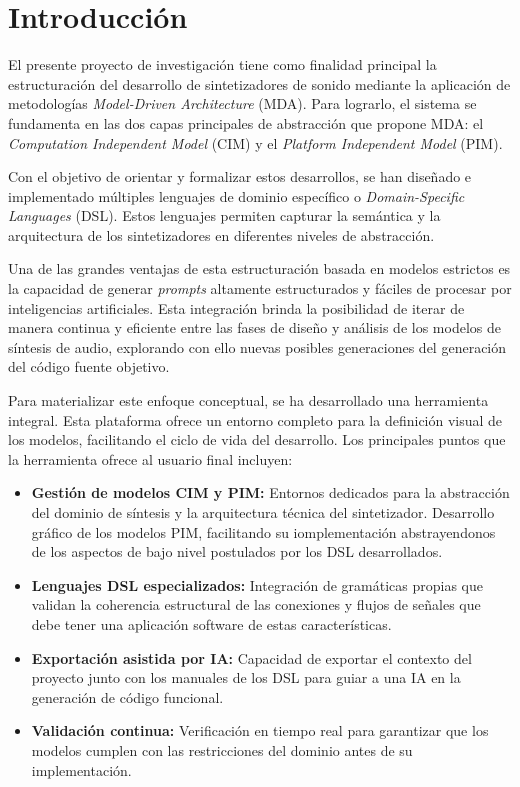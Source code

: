 \chapter{Introducción}

El presente proyecto de investigación tiene como finalidad principal la estructuración del desarrollo de sintetizadores de sonido mediante la aplicación de metodologías \textit{Model-Driven Architecture} (MDA). Para lograrlo, el sistema se fundamenta en las dos capas principales de abstracción que propone MDA: el \textit{Computation Independent Model} (CIM) y el \textit{Platform Independent Model} (PIM).

Con el objetivo de orientar y formalizar estos desarrollos, se han diseñado e implementado múltiples lenguajes de dominio específico o \textit{Domain-Specific Languages} (DSL). Estos lenguajes permiten capturar la semántica y la arquitectura de los sintetizadores en diferentes niveles de abstracción.

Una de las grandes ventajas de esta estructuración basada en modelos estrictos es la capacidad de generar \textit{prompts} altamente estructurados y fáciles de procesar por inteligencias artificiales. Esta integración brinda la posibilidad de iterar de manera continua y eficiente entre las fases de diseño y análisis de los modelos de síntesis de audio, explorando con ello nuevas posibles generaciones del generación del código fuente objetivo.

Para materializar este enfoque conceptual, se ha desarrollado una herramienta integral. Esta plataforma ofrece un entorno completo para la definición visual de los modelos, facilitando el ciclo de vida del desarrollo. Los principales puntos que la herramienta ofrece al usuario final incluyen:

\begin{itemize}
    \item \textbf{Gestión de modelos CIM y PIM:} Entornos dedicados para la abstracción del dominio de síntesis y la arquitectura técnica del sintetizador. Desarrollo gráfico de los modelos PIM, facilitando su iomplementación abstrayendonos de los aspectos de bajo nivel postulados por los DSL desarrollados.
    \item \textbf{Lenguajes DSL especializados:} Integración de gramáticas propias que validan la coherencia estructural de las conexiones y flujos de señales que debe tener una aplicación software de estas características.
    \item \textbf{Exportación asistida por IA:} Capacidad de exportar el contexto del proyecto junto con los manuales de los DSL para guiar a una IA en la generación de código funcional. 
    \item \textbf{Validación continua:} Verificación en tiempo real para garantizar que los modelos cumplen con las restricciones del dominio antes de su implementación.
\end{itemize}

